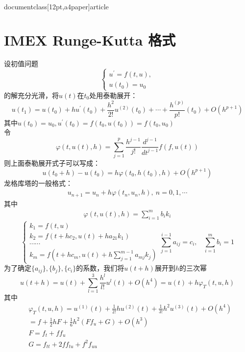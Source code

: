 \\documentclass[12pt,a4paper]{article}
\begin{document}
\section{IMEX Runge-Kutta 格式}
设初值问题
\begin{equation*}
\begin{cases}
u^{'}=f(t,u),\\
u(t_{0})=u_{0}
\end{cases}
\end{equation*}
的解充分光滑，将$u(t)$在$t_{0}$处用泰勒展开：
\begin{equation*}
u(t_{1})=u(t_{0})+hu^{'}(t_{0})+\frac{h^2}{2!}u^{(2)}(t_{0})+\cdots+\frac{h^{(p)}}{p!}(t_{0})+O(h^{p+1})
\end{equation*}
其中$u(t_{0})=u_{0},u^{'}(t_{0})=f(t_{0},u(t_{0}))=f(t_{0},u_{0})$\\
令
\begin{equation*}
\varphi(t,u(t),h)=\sum_{j=1}^{p}\frac{h^{j-1}}{j!}\frac{d^{j-1}}{dt^{j-1}}f(f,u(t))
\end{equation*}
则上面泰勒展开式子可以写成：
\begin{equation*}
u(t_{0}+h)-u(t_{0})=h\varphi(t_{0},h(t_{0}),h)+O(h^{p+1})
\end{equation*}
龙格库塔的一般格式：
\begin{gather*}
u_{n+1}=u_{n}+h\varphi(t_{n},u_{n},h),~n=0,1,\cdots
\end{gather*}
其中
\begin{gather}
\varphi(t,u(t),h)=\sum_{i=1}^{m}b_{i}k_{i}
\end{gather}
\begin{equation}
\begin{cases}
k_{1}=f(t,u)\\
k_{2}=f(t+hc_{2},u(t)+ha_{21}k_{1})\\
\cdots\cdots\\
k_{m}=f(t+hc_{m},u(t)+h\sum_{j=1}^{m-1}a_{mj}k_{j})
\end{cases}
\sum_{j=1}^{i-1}a_{ij}=c_{i},~~~~\sum_{i=1}^{m}b_{i}=1
\end{equation}
为了确定$\{a_{ij}\},\{b_{j}\},\{c_{i}\}$的系数，我们将$u(t+h)$展开到$h$的三次幂
\begin{equation*}
u(t+h)=u(t)+\sum_{l=1}^{3}\frac{h^l}{l!}u^{l}(t)+O(h^4)=u(t)+h\varphi_{T}(t,u,h)
\end{equation*}
其中
\begin{align*}
&\varphi_{T}(t,u,h)=u^{(1)}(t)+\frac{1}{2!}hu^{(2)}(t)+\frac{1}{3!}h^2u^{(3)}(t)+O(h^4)\\
&=f+\frac{1}{2}hF+\frac{1}{6}h^2(Ff_{u}+G)+O(h^3)\\
&F=f_{t}+ff_{u}\\
&G=f_{tt}+2ff_{tu}+f^2f_{uu}
\end{align*}
\end{document}
